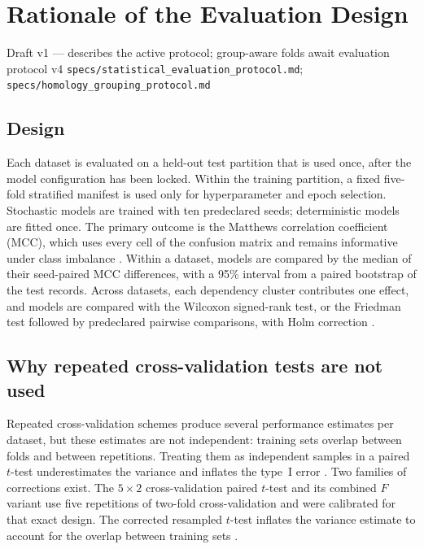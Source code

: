 
\section{Rationale of the Evaluation Design}\label{draft:evaluation-design}

{Draft v1 --- describes the active protocol; group-aware folds await evaluation protocol v4}
{\texttt{specs/statistical\_evaluation\_protocol.md};
\texttt{specs/homology\_grouping\_protocol.md}}

\subsection{Design}

Each dataset is evaluated on a held-out test partition that is used once,
after the model configuration has been locked. Within the training partition,
a fixed five-fold stratified manifest is used only for hyperparameter and
epoch selection. Stochastic models are trained with ten predeclared seeds;
deterministic models are fitted once. The primary outcome is the Matthews
correlation coefficient (MCC), which uses every cell of the confusion matrix
and remains informative under class imbalance \citep{chicco2020mcc}. Within a
dataset, models are compared by the median of their seed-paired MCC
differences, with a 95\% interval from a paired bootstrap of the test records.
Across datasets, each dependency cluster contributes one effect, and models are
compared with the Wilcoxon signed-rank test, or the Friedman test followed by
predeclared pairwise comparisons, with Holm correction
\citep{demsar2006statistical}.

\subsection{Why repeated cross-validation tests are not used}

Repeated cross-validation schemes produce several performance estimates per
dataset, but these estimates are not independent: training sets overlap
between folds and between repetitions. Treating them as independent samples in
a paired $t$-test underestimates the variance and inflates the type~I error
\citep{dietterich1998approximate,nadeau2003inference}. Two families of
corrections exist. The $5\times2$ cross-validation paired $t$-test
\citep{dietterich1998approximate} and its combined $F$ variant
\citep{alpaydin1999combined} use five repetitions of two-fold cross-validation
and were calibrated for that exact design. The corrected resampled $t$-test
inflates the variance estimate to account for the overlap between training sets
\citep{nadeau2003inference}.

